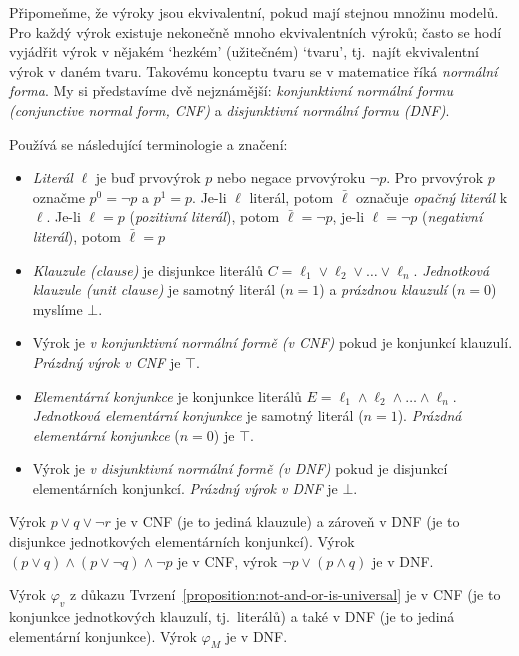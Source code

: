 Připomeňme, že výroky jsou ekvivalentní, pokud mají stejnou množinu modelů. Pro každý výrok existuje nekonečně mnoho ekvivalentních výroků; často se hodí vyjádřit výrok v nějakém `hezkém' (užitečném) `tvaru', tj.\ najít ekvivalentní výrok v daném tvaru. Takovému konceptu tvaru se v matematice říká \emph{normální forma}. My si představíme dvě nejznámější: \emph{konjunktivní normální formu (conjunctive normal form, CNF)} a \emph{disjunktivní normální formu (DNF)}. 

Používá se následující terminologie a značení:
\begin{itemize}
    \item \emph{Literál} $\ell$ je buď prvovýrok $p$ nebo negace prvovýroku $\neg p$. Pro prvovýrok $p$ označme $p^0=\neg p$ a $p^1=p$. Je-li $\ell$ literál, potom $\bar \ell$ označuje \emph{opačný literál} k $\ell$. Je-li $\ell=p$ (\emph{pozitivní literál}), potom $\bar \ell=\neg p$, je-li $\ell=\neg p$ (\emph{negativní literál}), potom $\bar \ell=p$
    \item \emph{Klauzule (clause)} je disjunkce literálů $C=\ell_1\lor\ell_2\lor\dots\lor\ell_n$. \emph{Jednotková klauzule (unit clause)} je samotný literál ($n=1$) a \emph{prázdnou klauzulí} ($n=0$) myslíme $\bot$.
    \item Výrok je \emph{v konjunktivní normální formě (v CNF)} pokud je konjunkcí klauzulí. \emph{Prázdný výrok v CNF} je $\top$.
    \item \emph{Elementární konjunkce} je konjunkce literálů $E=\ell_1\land\ell_2\land\dots\land\ell_n$. \emph{Jednotková elementární konjunkce} je samotný literál ($n=1$). \emph{Prázdná elementární konjunkce} ($n=0$) je $\top$.
    \item Výrok je \emph{v disjunktivní normální formě (v DNF)} pokud je disjunkcí elementárních konjunkcí. \emph{Prázdný výrok v DNF} je $\bot$.
\end{itemize}

\begin{example}
    Výrok ${{p\lor q}\lor\neg r}$ je v CNF (je to jediná klauzule) a zároveň v DNF (je to disjunkce jednotkových elementárních konjunkcí). Výrok $(p\lor q)\land (p\lor \neg q)\land \neg p$ je v CNF, výrok $\neg p\lor (p\land q)$ je v DNF.
\end{example}

\begin{example}
    Výrok $\varphi_v$ z důkazu Tvrzení~\ref{proposition:not-and-or-is-universal} je v CNF (je to konjunkce jednotkových klauzulí, tj.\ literálů) a také v DNF (je to jediná elementární konjunkce). Výrok $\varphi_M$ je v DNF.
\end{example}

